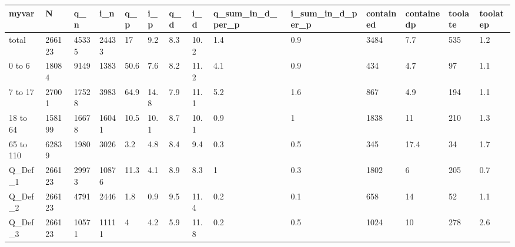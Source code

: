 \begin{table}[ht]
\centering
\begin{tabular}{llllllllllllll}
  \hline
myvar & N & q\_n & i\_n & q\_p & i\_p & q\_d & i\_d & q\_sum\_in\_d\_per\_p & i\_sum\_in\_d\_per\_p & contained & containedp & toolate & toolatep \\ 
  \hline
total & 266123 & 45335 & 24433 & 17 & 9.2 & 8.3 & 10.2 & 1.4 & 0.9 & 3484 & 7.7 & 535 & 1.2 \\ 
  0 to 6 & 18084 & 9149 & 1383 & 50.6 & 7.6 & 8.2 & 11.2 & 4.1 & 0.9 & 434 & 4.7 & 97 & 1.1 \\ 
  7 to 17 & 27001 & 17528 & 3983 & 64.9 & 14.8 & 7.9 & 11.1 & 5.2 & 1.6 & 867 & 4.9 & 194 & 1.1 \\ 
  18 to 64 & 158199 & 16678 & 16041 & 10.5 & 10.1 & 8.7 & 10.1 & 0.9 & 1 & 1838 & 11 & 210 & 1.3 \\ 
  65 to 110 & 62839 & 1980 & 3026 & 3.2 & 4.8 & 8.4 & 9.4 & 0.3 & 0.5 & 345 & 17.4 & 34 & 1.7 \\ 
  Q\_Def\_1 & 266123 & 29973 & 10876 & 11.3 & 4.1 & 8.9 & 8.3 & 1 & 0.3 & 1802 & 6 & 205 & 0.7 \\ 
  Q\_Def\_2 & 266123 & 4791 & 2446 & 1.8 & 0.9 & 9.5 & 11.4 & 0.2 & 0.1 & 658 & 14 & 52 & 1.1 \\ 
  Q\_Def\_3 & 266123 & 10571 & 11111 & 4 & 4.2 & 5.9 & 11.8 & 0.2 & 0.5 & 1024 & 10 & 278 & 2.6 \\ 
   \hline
\end{tabular}
\end{table}
